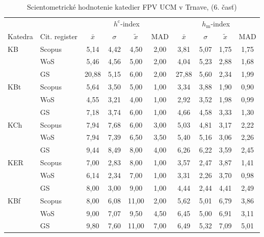 \begin{table}
  \centering\small
  \caption[Hodnotenie FPV\,--\,$h^{\mathrm{c}}$-index a $h_{\mathrm{m}}$-index]{Scientometrické hodnotenie katedier FPV UCM v Trnave, (6. časť)}
\label{tab:6-staff.results}
\begin{tabularx}{\textwidth}{XXcccc@{\hspace{3ex}}cccc}
  \toprule\noalign{\vspace{.3ex}}
       &      & \multicolumn{4}{c}{$h^{\mathrm{c}}$-index} & \multicolumn{4}{c}{$h_{\mathrm{m}}$-index} \\
 Katedra      & Cit. register& $\bar{x}$      & $\sigma$  & $\tilde{x}$ & MAD  & $\bar{x}$      & $\sigma$  & $\tilde{x}$  & MAD  \\[0.3ex]
  \midrule\noalign{\vspace{.5ex}}
 KB   & Scopus & 5,14     & 4,42 & 4,50  & 2,00 & 3,81     & 5,07 & 1,75 & 1,75 \\
      & WoS    & 5,46     & 4,56 & 5,00  & 2,00 & 4,04     & 5,23 & 2,88 & 1,68 \\
      & GS     & 20,88    & 5,15 & 6,00  & 2,00 & 27,88    & 5,60 & 2,34 & 1,99 \\[3ex]
 KBt  & Scopus & 5,64     & 3,50 & 5,00  & 1,00 & 3,34     & 3,88 & 1,90 & 0,90 \\
      & WoS    & 4,55     & 3,21 & 4,00  & 1,00 & 2,92     & 3,52 & 1,98 & 0,99 \\
      & GS     & 7,18     & 3,74 & 6,00  & 1,00 & 4,66     & 4,58 & 3,33 & 1,30 \\[3ex]
 KCh  & Scopus & 7,94     & 7,68 & 6,00  & 3,00 & 5,03     & 4,81 & 3,17 & 2,22 \\
      & WoS    & 7,94     & 7,39 & 6,50  & 3,50 & 5,40     & 5,16 & 3,06 & 2,26 \\
      & GS     & 9,44     & 8,49 & 8,00  & 4,00 & 6,26     & 6,22 & 3,59 & 2,45 \\[3ex]
 KER  & Scopus & 7,00     & 2,83 & 8,00  & 1,00 & 3,57     & 2,47 & 3,87 & 1,41 \\
      & WoS    & 6,14     & 2,34 & 7,00  & 1,00 & 3,31     & 2,26 & 3,70 & 0,98 \\
      & GS     & 8,00     & 3,00 & 9,00  & 1,00 & 4,44     & 2,44 & 4,41 & 2,49 \\[3ex]
 KBf  & Scopus & 8,00     & 6,08 & 11,00 & 2,00 & 5,62     & 5,01 & 6,79 & 3,86 \\
      & WoS    & 9,00     & 7,07 & 9,50  & 4,50 & 6,45     & 5,00 & 6,91 & 3,11 \\
      & GS     & 9,80     & 7,60 & 11,00 & 7,00 & 6,49     & 5,32 & 7,09 & 5,01 \\[3ex]

\end{tabularx}
\end{table}
